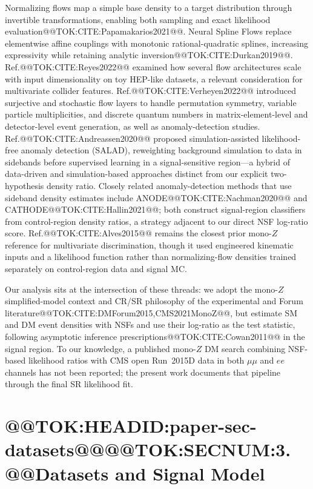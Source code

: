 \documentclass[11pt]{article}
\begin{document}
Normalizing flows map a simple base density to a target distribution through invertible
transformations, enabling both sampling and exact likelihood evaluation@@TOK:CITE:Papamakarios2021@@.
Neural Spline Flows replace elementwise affine couplings with monotonic rational-quadratic
splines, increasing expressivity while retaining analytic inversion@@TOK:CITE:Durkan2019@@.
Ref.@@TOK:CITE:Reyes2022@@ examined how several flow architectures scale with input
dimensionality on toy HEP-like datasets, a relevant consideration for multivariate collider
features.
Ref.@@TOK:CITE:Verheyen2022@@ introduced surjective and stochastic flow layers to handle
permutation symmetry, variable particle multiplicities, and discrete quantum numbers in
matrix-element-level and detector-level event generation, as well as anomaly-detection
studies.
Ref.@@TOK:CITE:Andreassen2020@@ proposed simulation-assisted likelihood-free anomaly detection
(SALAD), reweighting background simulation to data in sidebands before supervised
learning in a signal-sensitive region---a hybrid of data-driven and simulation-based
approaches distinct from our explicit two-hypothesis density ratio.
Closely related anomaly-detection methods that use sideband density estimates include
ANODE@@TOK:CITE:Nachman2020@@ and CATHODE@@TOK:CITE:Hallin2021@@; both construct signal-region
classifiers from control-region density ratios, a strategy adjacent to our direct NSF
log-ratio score.
Ref.@@TOK:CITE:Alves2015@@ remains the closest prior mono-$Z$ reference for multivariate
discrimination, though it used engineered kinematic inputs and a likelihood function rather
than normalizing-flow densities trained separately on control-region data and signal MC.

Our analysis sits at the intersection of these threads: we adopt the mono-$Z$ simplified-model
context and CR/SR philosophy of the experimental and Forum literature@@TOK:CITE:DMForum2015,CMS2021MonoZ@@,
but estimate SM and DM event densities with NSFs and use their log-ratio as the test
statistic, following asymptotic inference prescriptions@@TOK:CITE:Cowan2011@@ in the signal region.
To our knowledge, a published mono-$Z$ DM search combining NSF-based likelihood ratios with
CMS open Run~2015D data in both $\mu\mu$ and $ee$ channels has not been reported; the
present work documents that pipeline through the final SR likelihood fit.

\section{@@TOK:HEADID:paper-sec-datasets@@@@TOK:SECNUM:3. @@Datasets and Signal Model}
\end{document}
